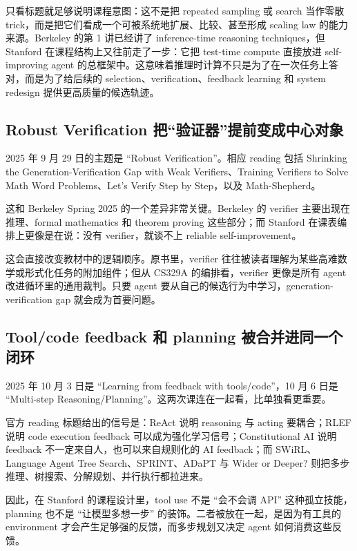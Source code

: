 \documentclass[UTF8]{ctexbook}
\begin{document}
只看标题就足够说明课程意图：这不是把 repeated sampling 或 search 当作零散 trick，而是把它们看成一个可被系统地扩展、比较、甚至形成 scaling law 的能力来源。Berkeley 的第 1 讲已经讲了 inference-time reasoning techniques，但 Stanford 在课程结构上又往前走了一步：它把 test-time compute 直接放进 self-improving agent 的总框架中。这意味着推理时计算不只是为了在一次任务上答对，而是为了给后续的 selection、verification、feedback learning 和 system redesign 提供更高质量的候选轨迹。

\subsection{Robust Verification 把“验证器”提前变成中心对象}

2025 年 9 月 29 日的主题是 ``Robust Verification''。相应 reading 包括 Shrinking the Generation-Verification Gap with Weak Verifiers、Training Verifiers to Solve Math Word Problems、Let's Verify Step by Step，以及 Math-Shepherd。

这和 Berkeley Spring 2025 的一个差异非常关键。Berkeley 的 verifier 主要出现在推理、formal mathematics 和 theorem proving 这些部分；而 Stanford 在课表编排上更像是在说：没有 verifier，就谈不上 reliable self-improvement。

这会直接改变教材中的逻辑顺序。原书里，verifier 往往被读者理解为某些高难数学或形式化任务的附加组件；但从 CS329A 的编排看，verifier 更像是所有 agent 改进循环里的通用裁判。只要 agent 要从自己的候选行为中学习，generation-verification gap 就会成为首要问题。

\subsection{Tool/code feedback 和 planning 被合并进同一个闭环}

2025 年 10 月 3 日是 ``Learning from feedback with tools/code''，10 月 6 日是 ``Multi-step Reasoning/Planning''。这两次课连在一起看，比单独看更重要。

官方 reading 标题给出的信号是：ReAct 说明 reasoning 与 acting 要耦合；RLEF 说明 code execution feedback 可以成为强化学习信号；Constitutional AI 说明 feedback 不一定来自人，也可以来自规则化的 AI feedback；而 SWiRL、Language Agent Tree Search、SPRINT、ADaPT 与 Wider or Deeper? 则把多步推理、树搜索、分解规划、并行执行都拉进来。

因此，在 Stanford 的课程设计里，tool use 不是 ``会不会调 API'' 这种孤立技能，planning 也不是 ``让模型多想一步'' 的装饰。二者被放在一起，是因为有工具的 environment 才会产生足够强的反馈，而多步规划又决定 agent 如何消费这些反馈。
\end{document}
